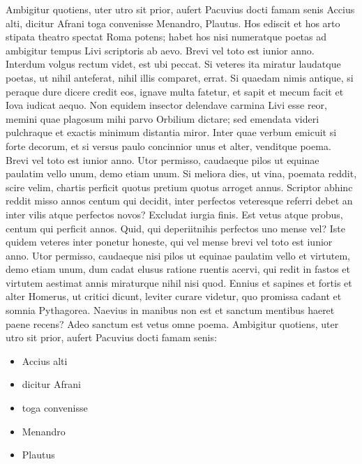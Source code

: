 \documentclass[article,colorback,accentcolor=tud4c]{tudreport}
\begin{document}
    Ambigitur quotiens, uter utro sit prior, aufert Pacuvius docti famam senis Accius alti, dicitur Afrani toga convenisse Menandro, Plautus. Hos ediscit et hos arto stipata theatro spectat Roma potens; habet hos nisi numeratque poetas ad ambigitur tempus Livi scriptoris ab aevo. Brevi vel toto est iunior anno. Interdum volgus rectum videt, est ubi peccat. Si veteres ita miratur laudatque poetas, ut nihil anteferat, nihil illis comparet, errat.  Si quaedam nimis antique, si peraque dure dicere credit eos, ignave multa fatetur, et sapit et mecum facit et Iova iudicat aequo. Non equidem insector delendave carmina Livi esse reor, memini quae plagosum mihi parvo Orbilium dictare; sed emendata videri pulchraque et exactis minimum distantia miror. Inter quae verbum emicuit si forte decorum, et si versus paulo concinnior unus et alter, venditque poema. Brevi vel toto est iunior anno. Utor permisso, caudaeque pilos ut equinae paulatim vello unum, demo etiam unum. Si meliora dies, ut vina, poemata reddit, scire velim, chartis perficit quotus pretium quotus arroget annus. Scriptor abhinc reddit misso annos centum qui decidit, inter perfectos veteresque referri debet an inter vilis atque perfectos novos? Excludat iurgia finis.
    Est vetus atque probus, centum qui perficit annos. Quid, qui deperiitnihis perfectos uno mense vel? Iste quidem veteres inter ponetur honeste, qui vel mense brevi vel toto est iunior anno. Utor permisso, caudaeque nisi pilos ut equinae paulatim vello et virtutem, demo etiam unum, dum cadat elusus ratione ruentis acervi, qui redit in fastos et virtutem aestimat annis miraturque nihil nisi quod. Ennius et sapines et fortis et alter Homerus, ut critici dicunt, leviter curare videtur, quo promissa cadant et somnia Pythagorea.  Naevius in manibus non est et sanctum mentibus haeret paene recens?  Adeo sanctum est vetus omne poema. Ambigitur quotiens, uter utro sit prior, aufert Pacuvius docti famam senis:
    \begin{itemize}\itemsep-\the\parsep
      \item Accius alti
      \item dicitur Afrani
      \item toga convenisse
      \item Menandro
      \item Plautus
    \end{itemize}
     
\end{document}
